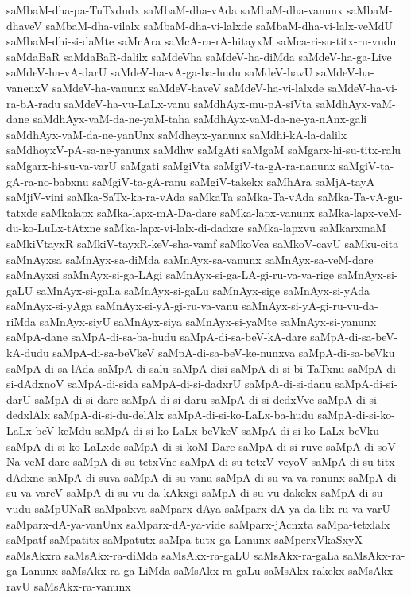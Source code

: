 {saMbaM-dha-pa-TuTxdudx
saMbaM-dha-vAda
saMbaM-dha-vanunx
saMbaM-dhaveV
saMbaM-dha-vilalx
saMbaM-dha-vi-lalxde
saMbaM-dha-vi-lalx-veMdU
saMbaM-dhi-si-daMte
saMcAra
saMcA-ra-rA-hitayxM
saMca-ri-su-titx-ru-vudu
saMdaBaR
saMdaBaR-dalilx
saMdeVha
saMdeV-ha-diMda
saMdeV-ha-ga-Live
saMdeV-ha-vA-darU
saMdeV-ha-vA-ga-ba-hudu
saMdeV-havU
saMdeV-ha-vanenxV
saMdeV-ha-vanunx
saMdeV-haveV
saMdeV-ha-vi-lalxde
saMdeV-ha-vi-ra-bA-radu
saMdeV-ha-vu-LaLx-vanu
saMdhAyx-mu-pA-siVta
saMdhAyx-vaM-dane
saMdhAyx-vaM-da-ne-yaM-taha
saMdhAyx-vaM-da-ne-ya-nAnx-gali
saMdhAyx-vaM-da-ne-yanUnx
saMdheyx-yanunx
saMdhi-kA-la-dalilx
saMdhoyxV-pA-sa-ne-yanunx
saMdhw
saMgAti
saMgaM
saMgarx-hi-su-titx-ralu
saMgarx-hi-su-va-varU
saMgati
saMgiVta
saMgiV-ta-gA-ra-nanunx
saMgiV-ta-gA-ra-no-babxnu
saMgiV-ta-gA-ranu
saMgiV-takekx
saMhAra
saMjA-tayA
saMjiV-vini
saMka-SaTx-ka-ra-vAda
saMkaTa
saMka-Ta-vAda
saMka-Ta-vA-gu-tatxde
saMkalapx
saMka-lapx-mA-Da-dare
saMka-lapx-vanunx
saMka-lapx-veM-du-ko-LuLx-tAtxne
saMka-lapx-vi-lalx-di-dadxre
saMka-lapxvu
saMkarxmaM
saMkiVtayxR
saMkiV-tayxR-keV-sha-vamf
saMkoVca
saMkoV-cavU
saMku-cita
saMnAyxsa
saMnAyx-sa-diMda
saMnAyx-sa-vanunx
saMnAyx-sa-veM-dare
saMnAyxsi
saMnAyx-si-ga-LAgi
saMnAyx-si-ga-LA-gi-ru-va-va-rige
saMnAyx-si-gaLU
saMnAyx-si-gaLa
saMnAyx-si-gaLu
saMnAyx-sige
saMnAyx-si-yAda
saMnAyx-si-yAga
saMnAyx-si-yA-gi-ru-va-vanu
saMnAyx-si-yA-gi-ru-vu-da-riMda
saMnAyx-siyU
saMnAyx-siya
saMnAyx-si-yaMte
saMnAyx-si-yanunx
saMpA-dane
saMpA-di-sa-ba-hudu
saMpA-di-sa-beV-kA-dare
saMpA-di-sa-beV-kA-dudu
saMpA-di-sa-beVkeV
saMpA-di-sa-beV-ke-nunxva
saMpA-di-sa-beVku
saMpA-di-sa-lAda
saMpA-di-salu
saMpA-disi
saMpA-di-si-bi-TaTxnu
saMpA-di-si-dAdxnoV
saMpA-di-sida
saMpA-di-si-dadxrU
saMpA-di-si-danu
saMpA-di-si-darU
saMpA-di-si-dare
saMpA-di-si-daru
saMpA-di-si-dedxVve
saMpA-di-si-dedxlAlx
saMpA-di-si-du-delAlx
saMpA-di-si-ko-LaLx-ba-hudu
saMpA-di-si-ko-LaLx-beV-keMdu
saMpA-di-si-ko-LaLx-beVkeV
saMpA-di-si-ko-LaLx-beVku
saMpA-di-si-ko-LaLxde
saMpA-di-si-koM-Dare
saMpA-di-si-ruve
saMpA-di-soV-Na-veM-dare
saMpA-di-su-tetxVne
saMpA-di-su-tetxV-veyoV
saMpA-di-su-titx-dAdxne
saMpA-di-suva
saMpA-di-su-vanu
saMpA-di-su-va-va-ranunx
saMpA-di-su-va-vareV
saMpA-di-su-vu-da-kAkxgi
saMpA-di-su-vu-dakekx
saMpA-di-su-vudu
saMpUNaR
saMpalxva
saMparx-dAya
saMparx-dA-ya-da-lilx-ru-va-varU
saMparx-dA-ya-vanUnx
saMparx-dA-ya-vide
saMparx-jAcnxta
saMpa-tetxlalx
saMpatf
saMpatitx
saMpatutx
saMpa-tutx-ga-Lanunx
saMperxVkaSxyX
saMsAkxra
saMsAkx-ra-diMda
saMsAkx-ra-gaLU
saMsAkx-ra-gaLa
saMsAkx-ra-ga-Lanunx
saMsAkx-ra-ga-LiMda
saMsAkx-ra-gaLu
saMsAkx-rakekx
saMsAkx-ravU
saMsAkx-ra-vanunx
}
